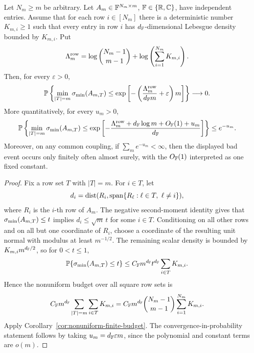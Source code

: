 \begin{corollary}\label{cor:rowwise-heterogeneous-square}
Let \(N_m\ge m\) be arbitrary.  Let \(A_m\in\mathbb{F}^{N_m\times m}\),
\(\mathbb{F}\in\{\mathbb{R},\mathbb{C}\}\), have independent entries.  Assume that for each row
\(i\in[N_m]\) there is a deterministic number \(K_{m,i}\ge1\) such that every
entry in row \(i\) has \(d_{\mathbb{F}}\)-dimensional Lebesgue density bounded by
\(K_{m,i}\).  Put
\[
  \Lambda_m^{\rm row}
  =
  \log\binom{N_m-1}{m-1}
  +\log\left(\sum_{i=1}^{N_m}K_{m,i}\right).
\]
Then, for every \(\varepsilon>0\),
\[
  \mathbb{P}\left\{
  \min_{|T|=m}\sigma_{\min}(A_{m,T})
  \le
  \exp\left[-\left(\frac{\Lambda_m^{\rm row}}{d_{\mathbb{F}} m}+\varepsilon\right)m\right]
  \right\}
  \longrightarrow0.
\]
More quantitatively, for every \(u_m>0\),
\[
  \mathbb{P}\left\{
  \min_{|T|=m}\sigma_{\min}(A_{m,T})
  \le
  \exp\left[-\frac{\Lambda_m^{\rm row}+d_{\mathbb{F}}\log m+O_{\mathbb{F}}(1)+u_m}{d_{\mathbb{F}}}\right]
  \right\}
  \le e^{-u_m}.
\]
Moreover, on any common coupling, if \(\sum_m e^{-u_m}<\infty\), then the
displayed bad event occurs only finitely often almost surely, with the
\(O_{\mathbb{F}}(1)\) interpreted as one fixed constant.
\end{corollary}

\begin{proof}
Fix a row set \(T\) with \(|T|=m\).  For \(i\in T\), let
\[
  d_i=\dist(R_i,\spn\{R_\ell:\ell\in T,\ \ell\ne i\}),
\]
where \(R_i\) is the \(i\)-th row of \(A_m\).  The negative second-moment
identity gives that \(\sigma_{\min}(A_{m,T})\le t\) implies \(d_i\le\sqrt m\,t\) for
some \(i\in T\).  Conditioning on all other rows and on all but one coordinate
of \(R_i\), choose a coordinate of the resulting unit normal with modulus at
least \(m^{-1/2}\).  The remaining scalar density is bounded by
\(K_{m,i}m^{d_{\mathbb{F}}/2}\), so for \(0<t\le1\),
\[
  \mathbb{P}\{\sigma_{\min}(A_{m,T})\le t\}
  \le C_{\mathbb{F}} m^{d_{\mathbb{F}}}t^{d_{\mathbb{F}}}\sum_{i\in T}K_{m,i}.
\]
Hence the nonuniform budget over all square row sets is
\[
  C_{\mathbb{F}} m^{d_{\mathbb{F}}}\sum_{|T|=m}\sum_{i\in T}K_{m,i}
  =
  C_{\mathbb{F}} m^{d_{\mathbb{F}}}\binom{N_m-1}{m-1}\sum_{i=1}^{N_m}K_{m,i}.
\]
Apply Corollary~\ref{cor:nonuniform-finite-budget}.  The convergence-in-probability
statement follows by taking \(u_m=d_{\mathbb{F}}\varepsilon m\), since the polynomial and
constant terms are \(o(m)\).
\end{proof}

